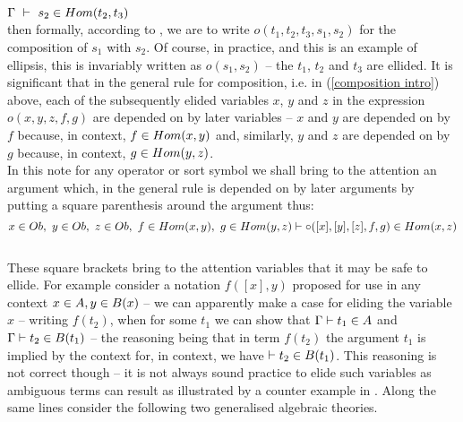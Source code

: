\documentclass[10pt,a4paper,fleqn]{article}
\begin{document}
$\Gamma\ \tstyle\ \ofT{s_2}{Hom(t_2,t_3)}$ \\

\noindent
then formally, according to \cite{Cartmell86},  we are to write $o(t_1,t_2,t_3,s_1,s_2)$ for the composition 
of $s_1$ with $s_2$. Of course, in practice, and this is an example of ellipsis, this is invariably
written as $o(s_1,s_2)$ -- the $t_1$, $t_2$ and $t_3$ are ellided. 
It is significant that in the general rule for composition, i.e. in (\ref{composition intro}) above, each of the subsequently
elided variables 
$x$, $y$ and  $z$ in the expression $o(x,y,z,f,g)$ are depended on by later variables --  
$x$ and $y$ are depended on by $f$ 
because, in context, $f \in Hom(x,y)$ and, similarly, $y$ and $z$ are depended on by $g$ because, 
in context, $g \in Hom(y,z)$. \\

\indent
In this note for any operator or sort symbol we shall bring to the attention an argument which, in the general rule
is depended
on by later arguments by putting a square parenthesis around the argument thus: \\

$$\ofT{x}{Ob},\ \ofT{y}{Ob},\ \ofT{z}{Ob},\ \ofT{f}{Hom(x,y)},\ \ofT{g}{Hom(y,z)} \tstyle 
                    \ofT{\circ([x], [y], [z], f,g)}{Hom(x,z)}\label{composition bracket example}$$ \\

\noindent
These square brackets bring to the attention variables that it may be safe to ellide. 
For example consider a notation $f([x],y)$ proposed for use in any context $x \in A,y \in B(x)$ -- 
we can apparently make a case for eliding the variable $x$  -- writing $f(t_2)$, when for
some $t_1$ we can show that $\Gamma \vdash t_1 \in A$ and $\Gamma \vdash t_2 \in B(t_1)$ --
the reasoning being that in term $f(t_2)$ the argument $t_1$ is implied by the context for, in context, we
have $\vdash t_2 \in B(t_1)$.
This reasoning is not correct though -- 
it is not always sound practice to elide such variables
as ambiguous terms can result as illustrated  by a counter example in \cite{Cartmell86}. 
Along the same lines consider the following two
generalised algebraic theories.
\end{document}
